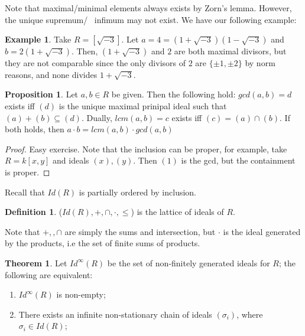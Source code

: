 \documentclass{article}
\theoremstyle{definition}
\newtheorem{theorem}{Theorem}[section]
\theoremstyle{definition}
\theoremstyle{definition}
\newtheorem{proposition}{Proposition}[section]
\theoremstyle{definition}
\theoremstyle{definition}
\newtheorem{definition}{Definition}[section]
\theoremstyle{definition}
\theoremstyle{definition}
\newtheorem{example}{Example}[section]
\begin{document}
Note that maximal/minimal elements always exists by Zorn's lemma. However, the unique supremum/ \ infimum may not exist. We have our following example:

\begin{tcolorbox}[colback=yellow!5!white,colframe=yellow!30!white]
\begin{example}
Take $R=[\sqrt{-3}]$. Let $a=4=(1+\sqrt{-3})(1-\sqrt{-3})$ and $b=2(1+\sqrt{-3})$. Then, $(1+\sqrt{-3})$ and $2$ are both maximal divisors, but they are not comparable since the only divisors of $2$ are $\{ \pm 1, \pm 2 \}$ by norm reasons, and none divides $1+\sqrt{-3}$.
\end{example}
\end{tcolorbox}


\begin{tcolorbox}[colback=blue!5!white,colframe=blue!30!white]
\begin{proposition}
    Let $a,b\in R$ be given. Then the following hold: $gcd(a,b)=d$ exists iff $(d)$ is the unique maximal prinipal ideal such that $(a)+(b)\subseteq (d)$. Dually, $lcm(a,b)=c$ exists iff $(c)=(a)\cap (b)$. If both holds, then $a\cdot b=lcm(a,b)\cdot gcd(a,b)$
\end{proposition}
\end{tcolorbox}

\begin{proof}
    Easy exercise. Note that the inclusion can be proper, for example, take $R=k[x,y]$ and ideals $(x),(y)$. Then $(1)$ is the gcd, but the containment is proper.
\end{proof}
Recall that $Id(R)$ is partially ordered by inclusion. 


\begin{tcolorbox}[colback=purple!5!white,colframe=purple!75!black]
\begin{definition}
    ($Id(R), +,\cap,\cdot,\leq$) is the lattice of ideals of $R$.
\end{definition}
\end{tcolorbox}

Note that $+,,\cap$ are simply the sums and intersection, but $\cdot$ is the ideal generated by the products, i.e the set of finite sums of products. 


\begin{tcolorbox}[colback=red!5!white,colframe=red!30!white]
\begin{theorem}
    Let $Id^{\infty}(R)$ be the set of non-finitely generated ideals for $R$; the following are equivalent:
\begin{enumerate}
    \item $Id^{\infty}(R)$ is non-empty; 
    \item  There exists an infinite non-stationary chain of ideals $(\sigma_i)$, where $\sigma_i\in Id(R)$;
\end{enumerate}
\end{theorem}
\end{tcolorbox}
\end{document}
